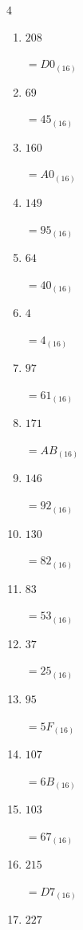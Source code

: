 \begin{multicols}{4}
\begin{enumerate}
  \item $208$

        $=D0_{(16)}$

  \item $69$

        $=45_{(16)}$

  \item $160$

        $=A0_{(16)}$

  \item $149$

        $=95_{(16)}$

  \item $64$

        $=40_{(16)}$

  \item $4$

        $=4_{(16)}$

\columnbreak %

  \item $97$

        $=61_{(16)}$

  \item $171$

        $=AB_{(16)}$

  \item $146$

        $=92_{(16)}$

  \item $130$

        $=82_{(16)}$

  \item $83$

        $=53_{(16)}$

  \item $37$

        $=25_{(16)}$

  \item $95$

        $=5F_{(16)}$

  \item $107$

        $=6B_{(16)}$

  \item $103$

        $=67_{(16)}$

  \item $215$

        $=D7_{(16)}$

  \item $227$


\end{enumerate}
\end{multicols}
